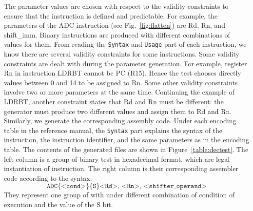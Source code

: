 The parameter values are chosen with respect to the validity constraints to
ensure that the instruction is defined and predictable.
For example, the parameters of the {\stt ADC} instruction (see
Fig.~\ref{fig:flatten}) are {\stt Rd}, {\stt Rn}, and {\stt shift\_imm}.
Binary instructions are produced with different combinations of values for them.
From reading the \texttt{Syntax} and \texttt{Usage} part of each instruction,
we know there are several validity constraints for some instructions.
Some validity constraints are dealt with during the parameter generation.
For example, register {\stt Rn} in instruction {\stt LDRBT} cannot be
{\stt PC} ({\stt R15}).
Hence the test chooses directly values between 0 and 14 to be assigned to {\stt Rn}.
Some other validity constraints involve two or more
parameters at the same time.
Continuing the example of {\stt LDRBT}, another constraint states
that {\stt Rd} and {\stt Rn} must be different:
the generator must produce two different values
and assign them to {\stt Rd} and {\stt Rn}.
Similarly, we generate the corresponding assembly code. Under each encoding
table in the reference manual, the \texttt{Syntax} part explains the syntax
of the instruction, the instruction identifier, and the same parameters as in
the encoding table.
The contents of the generated files are shown in Figure~\ref{table:dectest}.
The left column is a group of binary test in hexadecimal format,
which are legal instantiation of \adc instruction.
The right column is their corresponding assembler code according to
the syntax:
$$\texttt{ADC\{<cond>\}\{S\} <Rd>, <Rn>, <shifter\_operand>}$$
They represent one group of \adc with under different combination of
condition of execution and the value of the S bit.

